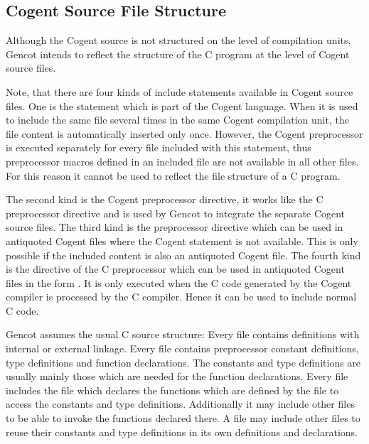 \subsection{Cogent Source File Structure}
\label{design-files}

Although the Cogent source is not structured on the level of compilation units, Gencot intends to reflect the structure of 
the C program at the level of Cogent source files. 

Note, that there are four kinds of include statements available in Cogent source files. One is the  statement which
is part of the Cogent language. When it is used to include the same file several times in the same Cogent compilation unit,
the file content is automatically inserted only once. However, the Cogent preprocessor is executed separately for every file included 
with this  statement, thus preprocessor macros defined in an included file are not available in all other files. For 
this reason it cannot be used to reflect the file structure of a C program.

The second kind is the Cogent preprocessor  directive, it works like the C preprocessor  directive
and is used by Gencot to integrate the separate Cogent source files. 
The third kind is the preprocessor  directive 
which can be used in antiquoted Cogent files where the Cogent  statement is not available. This is only possible 
if the included content is also an antiquoted Cogent file. The fourth kind
is the  directive of the C preprocessor which can be used in antiquoted Cogent files in the form 
. It is only executed when the C code generated by the Cogent compiler is processed by the C compiler.
Hence it can be used to include normal C code.

Gencot assumes the usual C source structure: Every  file contains definitions with internal or external linkage.
Every 
file contains preprocessor constant definitions, type definitions and function declarations. The constants and type definitions 
are usually mainly those which are needed for the function declarations. Every  file includes the  file which
declares the functions which are defined by the  file to access the constants and type definitions. Additionally it may
include other  files to be able to invoke the functions declared there. A  file may include other  files
to reuse their constants and type definitions in its own definitions and declarations.


